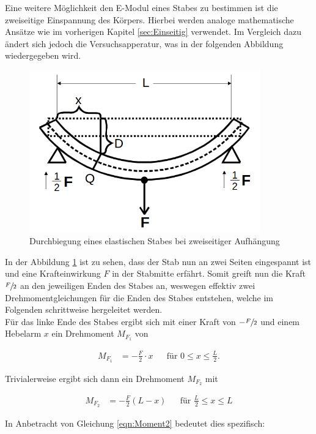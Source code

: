Eine weitere Möglichkeit den E-Modul eines Stabes zu bestimmen ist die zweiseitige Einspannung des Körpers. Hierbei werden
analoge mathematische Ansätze wie im vorherigen Kapitel \ref{sec:Einseitig} verwendet. Im Vergleich dazu ändert sich jedoch 
die Versuchsapperatur, was in der folgenden Abbildung wiedergegeben wird.

\begin{figure}
    \centering
    \includegraphics[height=7cm]{./content/Zweiseitig.png}
    \caption{Durchbiegung eines elastischen Stabes bei zweiseitiger Aufhängung}
    \label{fig:Zweiseitig}
\end{figure}

In der Abbildung \ref{fig:Zweiseitig} ist zu sehen, dass der Stab nun an zwei Seiten eingespannt ist und eine Krafteinwirkung $F$
in der Stabmitte erfährt. Somit greift nun die Kraft $\sfrac{F}{2}$ an den jeweiligen Enden des Stabes an, weswegen effektiv
zwei Drehmomentgleichungen für die Enden des Stabes entstehen, welche im Folgenden schrittweise hergeleitet werden.\\
\noindent Für das linke Ende des Stabes ergibt sich mit einer Kraft von $-\sfrac{F}{2}$ und einem Hebelarm $x$ ein Drehmoment $M_{F_1}$ von

\begin{align*}
    M_{F_1} &= -\frac{F}{2}\cdot x & &\text{für}\,\, 0 \leq x \leq \frac{L}{2}.
\end{align*}

\noindent Trivialerweise ergibt sich dann ein Drehmoment $M_{F_2}$ mit

\begin{align*}
    M_{F_2} &= -\frac{F}{2}\left(L-x\right) & &\text{für}\,\, \frac{L}{2} \leq x \leq L 
\end{align*}

\noindent In Anbetracht von Gleichung \eqref{eqn:Moment2} bedeutet dies spezifisch:

